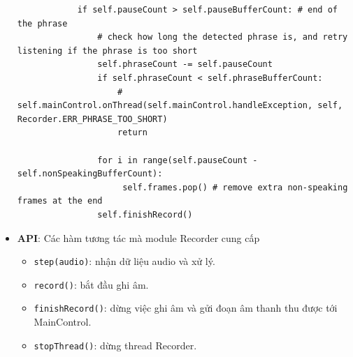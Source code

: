 \begin{itemize}
\begin{lstlisting}
            if self.pauseCount > self.pauseBufferCount: # end of the phrase
                # check how long the detected phrase is, and retry listening if the phrase is too short
                self.phraseCount -= self.pauseCount
                if self.phraseCount < self.phraseBufferCount:
                    # self.mainControl.onThread(self.mainControl.handleException, self, Recorder.ERR_PHRASE_TOO_SHORT)
                    return

                for i in range(self.pauseCount - self.nonSpeakingBufferCount):
                     self.frames.pop() # remove extra non-speaking frames at the end
                self.finishRecord()
\end{lstlisting}

\item \textbf{API}: Các hàm tương tác mà module Recorder cung cấp
\begin{itemize}
\item \lstinline{step(audio)}: nhận dữ liệu audio và xử lý.
\item \lstinline{record()}: bắt đầu ghi âm.
\item \lstinline{finishRecord()}: dừng việc ghi âm và gửi đoạn âm thanh thu được tới MainControl.
\item \lstinline{stopThread()}: dừng thread Recorder.
\end{itemize}
\end{itemize}

